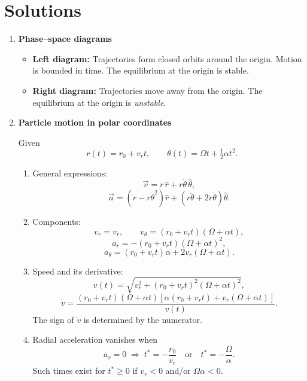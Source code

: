 \documentclass[../main.tex]{subfiles}
\begin{document}
\maketitle

\section*{Solutions}

\begin{enumerate}
\item \textbf{Phase--space diagrams}

\begin{itemize}
\item \textbf{Left diagram:} Trajectories form closed orbits around the origin. Motion is bounded in time. The equilibrium at the origin is stable.
\item \textbf{Right diagram:} Trajectories move away from the origin. The equilibrium at the origin is \emph{unstable}.
\end{itemize}

\item \textbf{Particle motion in polar coordinates}

Given
\[
r(t)=r_0+v_r t, \qquad \theta(t)=\Omega t+\tfrac12 \alpha t^2 .
\]

\begin{enumerate}
\item[(a)] General expressions:
\[
\vec{v}=\dot r\,\hat{r} + r\dot\theta\,\hat{{\theta}},
\]
\[
\vec{a}=(\ddot r-r\dot\theta^2)\hat{r}+(r\ddot\theta+2\dot r\dot\theta)\hat{{\theta}} .
\]

\item[(b)] Components:
\[
v_r=v_r,\qquad v_\theta=(r_0+v_r t)(\Omega+\alpha t),
\]
\[
a_r=-(r_0+v_r t)(\Omega+\alpha t)^2,
\]
\[
a_\theta=(r_0+v_r t)\alpha+2v_r(\Omega+\alpha t).
\]

\item[(c)] Speed and its derivative:
\[
v(t)=\sqrt{v_r^2+(r_0+v_r t)^2(\Omega+\alpha t)^2},
\]
\[
\dot v=\frac{(r_0+v_r t)(\Omega+\alpha t)\left[\alpha(r_0+v_r t)+v_r(\Omega+\alpha t)\right]}{v(t)}.
\]
The sign of $\dot v$ is determined by the numerator.

\item[(d)] Radial acceleration vanishes when
\[
a_r=0 \;\Rightarrow\; t^*=-\frac{r_0}{v_r}\quad \text{or}\quad t^*=-\frac{\Omega}{\alpha}.
\]
Such times exist for $t^*\ge0$ if $v_r<0$ and/or $\Omega\alpha<0$.
\end{enumerate}
\end{enumerate}
\end{document}
